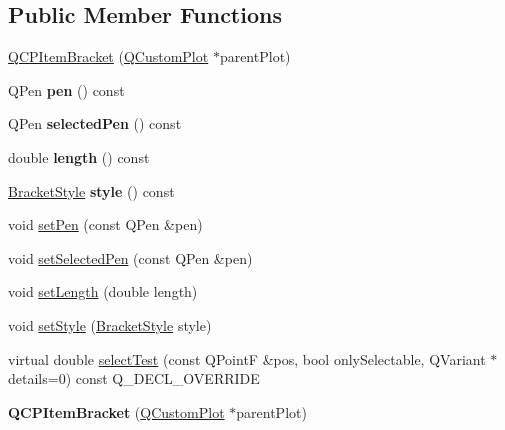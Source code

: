 \subsection*{Public Member Functions}
\begin{DoxyCompactItemize}
\item 
\hyperlink{class_q_c_p_item_bracket_a44ecfa37a76de5e3549e2d61f9d8ee56}{Q\+C\+P\+Item\+Bracket} (\hyperlink{class_q_custom_plot}{Q\+Custom\+Plot} $\ast$parent\+Plot)
\item 
Q\+Pen {\bfseries pen} () const \hypertarget{class_q_c_p_item_bracket_a8963ff4a232b649c83d2461fd3c30d39}{}\label{class_q_c_p_item_bracket_a8963ff4a232b649c83d2461fd3c30d39}

\item 
Q\+Pen {\bfseries selected\+Pen} () const \hypertarget{class_q_c_p_item_bracket_a9f6ea5ea9559ef36dfacdadd6e9bdcf0}{}\label{class_q_c_p_item_bracket_a9f6ea5ea9559ef36dfacdadd6e9bdcf0}

\item 
double {\bfseries length} () const \hypertarget{class_q_c_p_item_bracket_aed5126eafcb1381ee5718499c20ba023}{}\label{class_q_c_p_item_bracket_aed5126eafcb1381ee5718499c20ba023}

\item 
\hyperlink{class_q_c_p_item_bracket_a7ac3afd0b24a607054e7212047d59dbd}{Bracket\+Style} {\bfseries style} () const \hypertarget{class_q_c_p_item_bracket_afad726f453f70fe77c0e9c2f260fff97}{}\label{class_q_c_p_item_bracket_afad726f453f70fe77c0e9c2f260fff97}

\item 
void \hyperlink{class_q_c_p_item_bracket_ab13001d9cc5d8f9e56ea15bdda682acb}{set\+Pen} (const Q\+Pen \&pen)
\item 
void \hyperlink{class_q_c_p_item_bracket_a349785c31122778a520c64891fa204c5}{set\+Selected\+Pen} (const Q\+Pen \&pen)
\item 
void \hyperlink{class_q_c_p_item_bracket_ac7cfc3da7da9b5c5ac5dfbe4f0351b2a}{set\+Length} (double length)
\item 
void \hyperlink{class_q_c_p_item_bracket_a612dffa2373422eef8754d690add3703}{set\+Style} (\hyperlink{class_q_c_p_item_bracket_a7ac3afd0b24a607054e7212047d59dbd}{Bracket\+Style} style)
\item 
virtual double \hyperlink{class_q_c_p_item_bracket_a49a6b2f41e0a8c2a2e3a2836027a8455}{select\+Test} (const Q\+PointF \&pos, bool only\+Selectable, Q\+Variant $\ast$details=0) const Q\+\_\+\+D\+E\+C\+L\+\_\+\+O\+V\+E\+R\+R\+I\+DE
\item 
{\bfseries Q\+C\+P\+Item\+Bracket} (\hyperlink{class_q_custom_plot}{Q\+Custom\+Plot} $\ast$parent\+Plot)\hypertarget{class_q_c_p_item_bracket_a44ecfa37a76de5e3549e2d61f9d8ee56}{}\label{class_q_c_p_item_bracket_a44ecfa37a76de5e3549e2d61f9d8ee56}


\end{DoxyCompactItemize}
